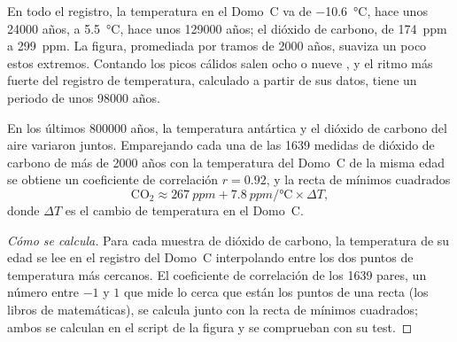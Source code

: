 En todo el registro, la temperatura en el Domo~C va de
\qty{-10.6}{\degreeCelsius}, hace unos \num{24000} años, a
\qty{+5.5}{\degreeCelsius}, hace unos \num{129000} años; el dióxido de carbono,
de \qty{174}{ppm} a \qty{299}{ppm}. La figura, promediada por tramos de \num{2000}
años, suaviza un poco estos extremos. Contando los picos cálidos salen ocho
o nueve , y el ritmo más fuerte del registro de temperatura,
calculado a partir de sus datos, tiene un periodo de unos \num{98000} años.

\begin{proposition}\label{prop:g12:past-climates:correlation}
En los últimos \num{800000} años, la temperatura antártica y el dióxido
de carbono del aire variaron juntos. Emparejando cada una de las 1639 medidas de dióxido
de carbono de más de \num{2000} años con la temperatura del Domo~C de la
misma edad se obtiene un coeficiente de correlación $r = 0.92$, y la
recta de mínimos cuadrados
\[
  \mathrm{CO_2} \approx \qty{267}{ppm} + \qty{7.8}{ppm/\degreeCelsius} \times \Delta T ,
\]
donde $\Delta T$ es el cambio de temperatura en el Domo~C.
\end{proposition}

\begin{proof}[Cómo se calcula]
Para cada muestra de dióxido de carbono, la temperatura de su edad se lee en el
registro del Domo~C interpolando entre los dos puntos de temperatura más cercanos.
El coeficiente de correlación de los 1639 pares, un número entre $-1$ y $1$
que mide lo cerca que están los puntos de una recta (los libros de
matemáticas), se calcula junto con la recta de mínimos cuadrados; ambos se calculan en el
script de la figura y se comprueban con su test.
\end{proof}


